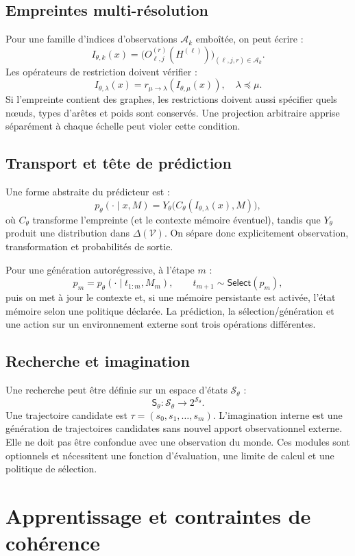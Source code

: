 \documentclass[11pt,a4paper]{article}
\theoremstyle{remark}
\newcommand{\V}{\mathcal V}
\newcommand{\Search}{\mathsf S}
\newcommand{\1}{\mathbf 1}
\begin{document}
\subsection{Empreintes multi-résolution}
Pour une famille d'indices d'observations $\mathcal A_k$ emboîtée, on peut écrire :
\[
I_{\theta,k}(x)=\bigl(O_{\ell,j}^{(r)}(H^{(\ell)})\bigr)_{(\ell,j,r)\in\mathcal A_k}.
\]
Les opérateurs de restriction doivent vérifier :
\[
I_{\theta,\lambda}(x)=r_{\mu\to\lambda}(I_{\theta,\mu}(x)),\quad \lambda\preceq\mu.
\]
Si l'empreinte contient des graphes, les restrictions doivent aussi spécifier quels nœuds, types d'arêtes et poids sont conservés. Une projection arbitraire apprise séparément à chaque échelle peut violer cette condition.

\subsection{Transport et tête de prédiction}
Une forme abstraite du prédicteur est :
\[
p_\theta(\cdot\mid x,M)=Y_\theta\bigl(C_\theta(I_{\theta,\lambda}(x),M)\bigr),
\]
où $C_\theta$ transforme l'empreinte (et le contexte mémoire éventuel), tandis que $Y_\theta$ produit une distribution dans $\Delta(\V)$. On sépare donc explicitement observation, transformation et probabilités de sortie.

Pour une génération autorégressive, à l'étape $m$ :
\[
p_m=p_\theta(\cdot\mid t_{1:m},M_m),\qquad t_{m+1}\sim\mathsf{Select}(p_m),
\]
puis on met à jour le contexte et, si une mémoire persistante est activée, l'état mémoire selon une politique déclarée. La prédiction, la sélection/génération et une action sur un environnement externe sont trois opérations différentes.

\subsection{Recherche et imagination}
Une recherche peut être définie sur un espace d'états $\mathscr S_\theta$ :
\[
\Search_\theta:\mathscr S_\theta\to 2^{\mathscr S_\theta}.
\]
Une trajectoire candidate est $\tau=(s_0,s_1,\ldots,s_m)$. L'imagination interne est une génération de trajectoires candidates sans nouvel apport observationnel externe. Elle ne doit pas être confondue avec une observation du monde. Ces modules sont optionnels et nécessitent une fonction d'évaluation, une limite de calcul et une politique de sélection.

\section{Apprentissage et contraintes de cohérence}
\end{document}
